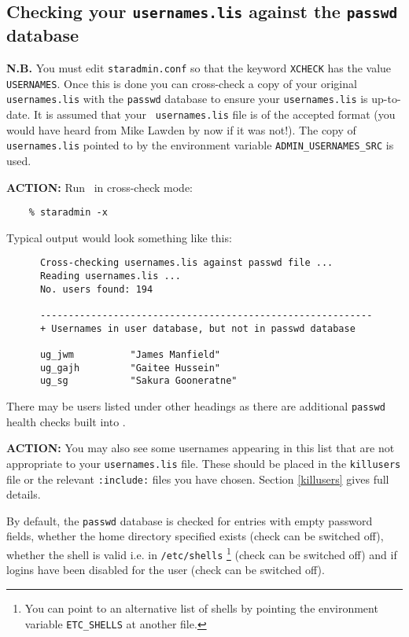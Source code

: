 \subsection{Checking your {\tt usernames.lis} against the {\tt passwd} database}
\label{xcheck_first}

{\bf N.B.} You must edit {\tt staradmin.conf} so that the keyword {\tt XCHECK}
has the value {\tt USERNAMES}. Once this is done you can cross-check a copy of
your original {\tt usernames.lis} with the {\tt passwd} database to  ensure
your {\tt usernames.lis} is up-to-date. It is assumed that your {\tt
usernames.lis} file is of the accepted format (you would have heard from Mike
Lawden by now if it was not!). The copy of {\tt usernames.lis} pointed to by
the environment variable {\tt ADMIN\_USERNAMES\_SRC} is used.

{\large\bf ACTION:} Run \staradmin\ in cross-check mode:

\begin{verbatim}
    % staradmin -x
\end{verbatim}

Typical output would look something like this:

\begin{small}
\begin{verbatim}
      Cross-checking usernames.lis against passwd file ...
      Reading usernames.lis ...
      No. users found: 194

      -----------------------------------------------------------
      + Usernames in user database, but not in passwd database
    
      ug_jwm          "James Manfield"
      ug_gajh         "Gaitee Hussein"
      ug_sg           "Sakura Gooneratne"

\end{verbatim}
\end{small}

There may be users listed under other headings as there are additional 
{\tt passwd} health checks built into \staradmin.

{\large\bf ACTION:} You may also see some usernames appearing in this list that
are not appropriate to your {\tt usernames.lis} file. These should be placed in 
the {\tt killusers} file or the relevant {\tt :include:} files you have chosen.
Section \ref{killusers} gives full details.

By default, the {\tt passwd} database is checked for entries with empty
password fields, whether the home directory specified exists (check can be
switched off), whether the shell is valid i.e. in {\tt /etc/shells} 
\footnote{You can point to an alternative list of shells by pointing the
environment variable {\tt ETC\_SHELLS} at another file.}
(check can be switched off) and if logins have been disabled for the user 
(check can be switched off).

